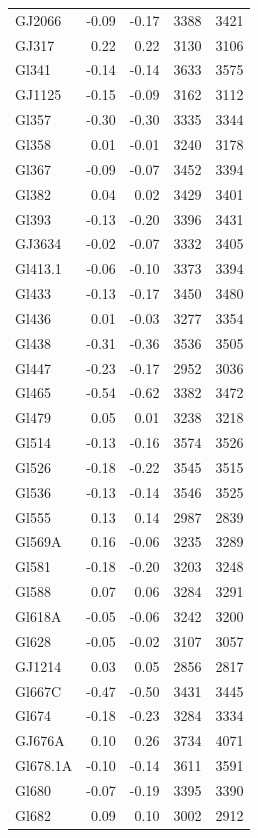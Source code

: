 \documentclass[referee]{aa}
\begin{document}
\begin{table}[]
{\begin{tabular}{ l r r r r}
GJ2066 & -0.09 & -0.17 & 3388 & 3421 \\
GJ317 & 0.22 & 0.22 & 3130 & 3106 \\
Gl341 & -0.14 & -0.14 & 3633 & 3575 \\
GJ1125 & -0.15 & -0.09 & 3162 & 3112 \\
Gl357 & -0.30 & -0.30 & 3335 & 3344 \\
Gl358 & 0.01 & -0.01 & 3240 & 3178 \\
Gl367 & -0.09 & -0.07 & 3452 & 3394 \\
Gl382 & 0.04 & 0.02 & 3429 & 3401 \\
Gl393 & -0.13 & -0.20 & 3396 & 3431 \\
GJ3634 & -0.02 & -0.07 & 3332 & 3405 \\
Gl413.1 & -0.06 & -0.10 & 3373 & 3394 \\
Gl433 & -0.13 & -0.17 & 3450 & 3480 \\
Gl436 & 0.01 & -0.03 & 3277 & 3354 \\
Gl438 & -0.31 & -0.36 & 3536 & 3505 \\
Gl447 & -0.23 & -0.17 & 2952 & 3036 \\
Gl465 & -0.54 & -0.62 & 3382 & 3472 \\
Gl479 & 0.05 & 0.01 & 3238 & 3218 \\
Gl514 & -0.13 & -0.16 & 3574 & 3526 \\
Gl526 & -0.18 & -0.22 & 3545 & 3515 \\
Gl536 & -0.13 & -0.14 & 3546 & 3525 \\
Gl555 & 0.13 & 0.14 & 2987 & 2839 \\
Gl569A & 0.16 & -0.06 & 3235 & 3289 \\
Gl581 & -0.18 & -0.20 & 3203 & 3248 \\
Gl588 & 0.07 & 0.06 & 3284 & 3291 \\
Gl618A & -0.05 & -0.06 & 3242 & 3200 \\
Gl628 & -0.05 & -0.02 & 3107 & 3057 \\
GJ1214 & 0.03 & 0.05 & 2856 & 2817 \\
Gl667C & -0.47 & -0.50 & 3431 & 3445 \\
Gl674 & -0.18 & -0.23 & 3284 & 3334 \\
GJ676A & 0.10 & 0.26 & 3734 & 4071 \\
Gl678.1A & -0.10 & -0.14 & 3611 & 3591 \\
Gl680 & -0.07 & -0.19 & 3395 & 3390 \\
Gl682 & 0.09 & 0.10 & 3002 & 2912 \\

\end{tabular}}
\end{table}
\end{document}
